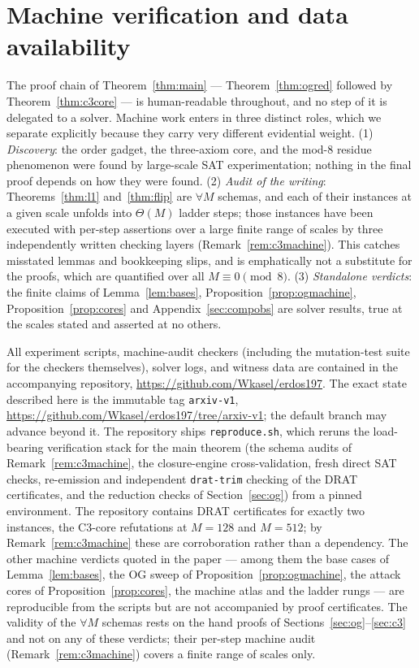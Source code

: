 \documentclass[11pt]{article}
\theoremstyle{definition}
\newcommand{\OG}{\mathrm{OG}}
\begin{document}
\section{Machine verification and data availability}\label{sec:data}

The proof chain of Theorem~\ref{thm:main} --- Theorem~\ref{thm:ogred}
followed by Theorem~\ref{thm:c3core} --- is human-readable throughout, and
no step of it is delegated to a solver. Machine work enters in three
distinct roles, which we separate explicitly because they carry very
different evidential weight. (1) \emph{Discovery}: the order gadget, the
three-axiom core, and the mod-$8$ residue phenomenon were found by
large-scale SAT experimentation; nothing in the final proof depends on how
they were found. (2) \emph{Audit of the writing}: Theorems~\ref{thm:l1}
and~\ref{thm:flip} are $\forall M$ schemas, and each of their instances at
a given scale unfolds into $\Theta(M)$ ladder steps; those instances have
been executed with per-step assertions over a large finite range of scales
by three independently written checking layers
(Remark~\ref{rem:c3machine}). This catches misstated lemmas and bookkeeping
slips, and is emphatically not a substitute for the proofs, which are
quantified over all $M \equiv 0 \pmod 8$. (3) \emph{Standalone verdicts}:
the finite claims of Lemma~\ref{lem:bases},
Proposition~\ref{prop:ogmachine}, Proposition~\ref{prop:cores} and
Appendix~\ref{sec:compobs} are solver results, true at the scales stated
and asserted at no others.

All experiment scripts, machine-audit checkers (including the mutation-test
suite for the checkers themselves), solver logs, and witness data are
contained in the accompanying repository,
\url{https://github.com/Wkasel/erdos197}. The exact state described here is
the immutable tag \texttt{arxiv-v1},
\url{https://github.com/Wkasel/erdos197/tree/arxiv-v1}; the default branch
may advance beyond it. The repository ships
\texttt{reproduce.sh}, which reruns the load-bearing verification stack for
the main theorem (the schema audits of Remark~\ref{rem:c3machine}, the
closure-engine cross-validation, fresh direct SAT checks, re-emission and
independent \texttt{drat-trim} checking of the DRAT certificates, and the
reduction checks of Section~\ref{sec:og}) from a pinned environment.
The repository contains DRAT certificates for exactly two instances, the
C3-core refutations at $M = 128$ and $M = 512$; by
Remark~\ref{rem:c3machine} these are corroboration rather than a
dependency. The other machine verdicts quoted in the paper --- among them
the base cases of Lemma~\ref{lem:bases}, the $\OG$ sweep of
Proposition~\ref{prop:ogmachine}, the attack cores of
Proposition~\ref{prop:cores}, the machine atlas and the ladder rungs ---
are reproducible from the scripts but are not accompanied by proof
certificates. The validity of the $\forall M$ schemas
rests on the hand proofs of Sections~\ref{sec:og}--\ref{sec:c3} and not on
any of these verdicts; their per-step machine audit
(Remark~\ref{rem:c3machine}) covers a finite range of scales only.
\end{document}
